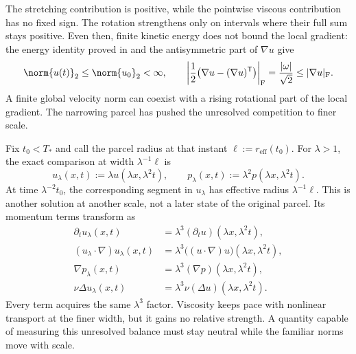 The stretching contribution is positive, while the pointwise viscous contribution has no fixed sign. The rotation strengthens only on intervals where their full sum stays positive. Even then, finite kinetic energy does not bound the local gradient: the energy identity proved in  and the antisymmetric part of \(\nabla u\) give
\[
  \norm{u(t)}_2
  \leq
  \norm{u_0}_2
  <\infty,
  \qquad
  \left|\frac12\bigl(\nabla u-(\nabla u)^{\mathsf T}\bigr)\right|_{\mathrm F}
  =
  \frac{|\omega|}{\sqrt2}
  \leq
  |\nabla u|_{\mathrm F}.
\]
A finite global velocity norm can coexist with a rising rotational part of the local gradient. The narrowing parcel has pushed the unresolved competition to finer scale.


Fix \(t_0<T_*\) and call the parcel radius at that instant \(\ell:=r_{\mathrm{eff}}(t_0)\). For \(\lambda>1\), the exact \NavierStokes{} comparison at width \(\lambda^{-1}\ell\) is
\[
  u_\lambda(x,t)
  :=
  \lambda u(\lambda x,\lambda^2t),
  \qquad
  p_\lambda(x,t)
  :=
  \lambda^2p(\lambda x,\lambda^2t).
\]
At time \(\lambda^{-2}t_0\), the corresponding segment in \(u_\lambda\) has effective radius \(\lambda^{-1}\ell\). This is another solution at another scale, not a later state of the original parcel. Its momentum terms transform as
\[
\begin{aligned}
  \partial_tu_\lambda(x,t)
  &=
  \lambda^3(\partial_tu)(\lambda x,\lambda^2t),
  \\
  (u_\lambda\cdot\nabla)u_\lambda(x,t)
  &=
  \lambda^3\bigl((u\cdot\nabla)u\bigr)(\lambda x,\lambda^2t),
  \\
  \nabla p_\lambda(x,t)
  &=
  \lambda^3(\nabla p)(\lambda x,\lambda^2t),
  \\
  \nu\Delta u_\lambda(x,t)
  &=
  \lambda^3\nu(\Delta u)(\lambda x,\lambda^2t).
\end{aligned}
\]
Every term acquires the same \(\lambda^3\) factor. Viscosity keeps pace with nonlinear transport at the finer width, but it gains no relative strength. A quantity capable of measuring this unresolved balance must stay neutral while the familiar norms move with scale.


